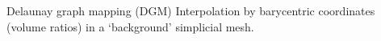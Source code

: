 \documentclass[t,12pt]{beamer}
\begin{document}
\begin{frame}{Delaunay graph mapping (DGM)}
Interpolation by barycentric coordinates (volume ratios) in a `background' simplicial mesh.
 \begin{figure}
 	\centering
\end{figure}
\end{frame}
\end{document}

